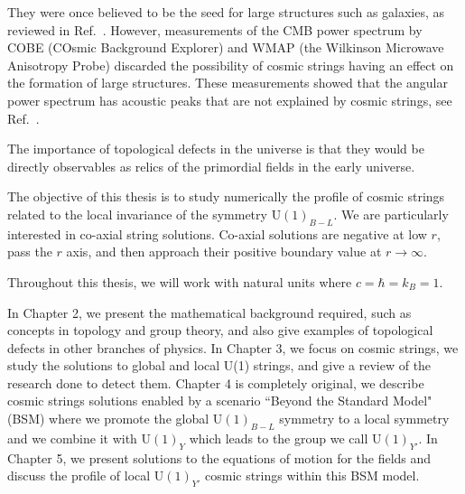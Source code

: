 They were once believed to be the seed for large structures such as galaxies, as reviewed in Ref.\ \cite{kibble1986}. However, measurements of the CMB power spectrum by COBE  (COsmic Background Explorer) and WMAP (the Wil\-kin\-son Microwave Anisotropy Probe) discarded the possibility of cosmic strings having an effect on the formation of large structures. These meas\-ure\-ments showed that the angular power spectrum has acoustic peaks that are not explained by cosmic strings, see Ref.\ \cite{pogo2006}. 

The importance of topological defects in the universe is that they would be directly observables as relics of the primordial fields in the early universe.

The objective of this thesis is to study numerically the profile of cosmic strings related to the local invariance of the symmetry $\text{U}(1)_{B-L}$. We are particularly interested in co-axial string solutions. Co-axial solutions are negative at low $r$, pass the $r$ axis, and then approach their positive boundary value at $r\to\infty$.

Throughout this thesis, we will work with natural units where $c=\hbar=k_B = 1$.

In Chapter 2, we present the mathematical background required, such as concepts in topology and group theory, and also give examples of topological defects in other branches of physics. In Chapter 3, we focus on cosmic strings, we study the solutions to global and local U(1) strings, and give a review of the research done to detect them. Chapter 4 is completely original, we describe cosmic strings solutions enabled by a scenario ``Beyond the Standard Model" (BSM) where we promote the global U$(1)_{B-L}$ symmetry to a local symmetry and we combine it with U$(1)_Y$ which leads to the group we call U$(1)_{Y'}$. In Chapter 5, we present solutions to the equations of motion for the fields and discuss the profile of local U$(1)_{Y'}$ cosmic strings within this BSM model. 


